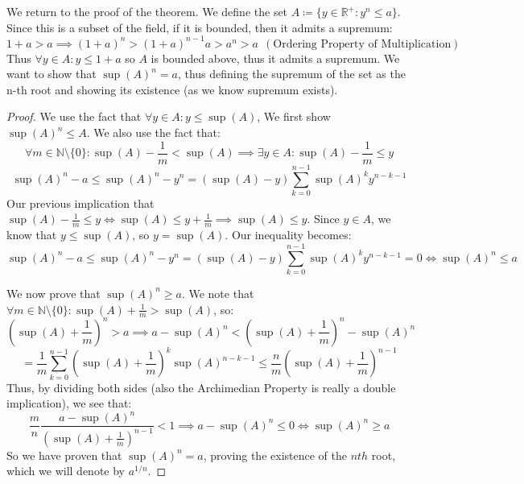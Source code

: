 \documentclass{article}
\begin{document}
\medskip
We return to the proof of the theorem. We define the set $A \coloneq \{y \in \mathbb{R}^+: y^n \leqslant a\}$. Since this is a subset of the field, if it is bounded, then it admits a supremum:
\begin{equation*}
    1 + a > a \implies (1 + a)^n > (1+a)^{n-1}a > a^n > a \ \ (\text{Ordering Property of Multiplication})
\end{equation*}
Thus $\forall y \in A: y \leqslant 1 + a$ so $A$ is bounded above, thus it admits a supremum. We want to show that $\sup(A)^n = a$, thus defining the supremum of the set as the n-th root and showing its existence (as we know supremum exists).
\begin{proof}
We use the fact that $\forall y \in A: y \leqslant \sup(A)$, We first show $\sup(A)^n \leqslant A$. We also use the fact that:
\begin{equation*}
    \forall m \in \mathbb{N}\setminus \{0\}: \sup(A) - \frac{1}{m} < \sup(A) \implies \exists y \in A: \sup(A) - \frac{1}{m} \leqslant y
\end{equation*}
\begin{equation*}
    \sup(A)^n - a \leqslant \sup(A)^n - y^n = (\sup(A) - y)\sum_{k=0}^{n-1}\sup(A)^k y^{n-k-1}
\end{equation*}
Our previous implication that $\sup(A) - \frac{1}{m} \leqslant y \iff \sup(A) \leqslant y + \frac{1}{m} \implies \sup(A) \leqslant y$. Since $y \in A$, we know that $y \leqslant \sup(A)$, so $y = \sup(A)$. Our inequality becomes:
\begin{equation*}
    \sup(A)^n - a \leqslant \sup(A)^n - y^n = (\sup(A) - y)\sum_{k=0}^{n-1}\sup(A)^k y^{n-k-1} = 0 \iff \sup(A)^n \leqslant a
\end{equation*}

\medskip
We now prove that $\sup(A)^n \geqslant a$. We note that $\forall m \in \mathbb{N}\setminus \{0\}: \sup(A) + \frac{1}{m} > \sup(A)$, so:
\begin{equation*}
    (\sup(A) + \frac{1}{m})^n > a \implies a - \sup(A)^n < (\sup(A) + \frac{1}{m})^n - \sup(A)^n 
\end{equation*}
\begin{equation*}
    = \frac{1}{m}\sum_{k=0}^{n-1}(\sup(A)+\frac{1}{m})^k \sup(A)^{n-k-1} \leqslant \frac{n}{m}(\sup(A) + \frac{1}{m})^{n-1}
\end{equation*}
Thus, by dividing both sides (also the Archimedian Property is really a double implication), we see that:
\begin{equation*}
    \frac{m}{n}\frac{a - \sup(A)^n}{(\sup(A) + \frac{1}{m})^{n-1}} < 1 \implies a - \sup(A)^n \leqslant 0 \iff \sup(A)^n \geqslant a
\end{equation*}
So we have proven that $\sup(A)^n = a$, proving the existence of the $nth$ root, which we will denote by $a^{1/n}$.
\end{proof}
\end{document}

